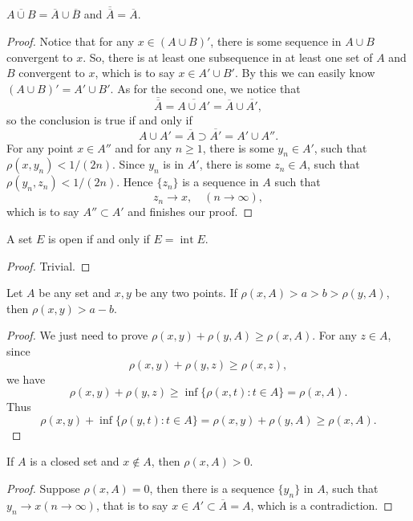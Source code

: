 \begin{pro}%
	$\overline{A\cup B}=\overline{A}\cup\overline{B}$ and $\overline{\overline{A}}=\overline{A}$.
\end{pro}
\begin{proof}
	Notice that for any $x\in(A\cup B)'$, there is some sequence in $A\cup B$ convergent to $x$. So, there is at least one subsequence in at least one set of $A$ and $B$ convergent to $x$, which is to say $x\in A'\cup B'$. By this we can easily know $(A\cup B)'=A'\cup B'$. As for the second one, we notice that
	\[\overline{\overline{A}}=\overline{A\cup A'}=\overline{A}\cup \overline{A'},\]
	so the conclusion is true if and only if 
	\[A\cup A'=\overline{A}\supset \overline{A'}=A'\cup A''.\]
	For any point $x\in A''$ and for any $n\geq 1$, there is some $y_n\in A'$, such that $\rho(x,y_n)<1/(2n)$. Since $y_n$ is in $A'$, there is some $z_n\in A$, such that $\rho(y_n,z_n)<1/(2n)$. Hence $\{z_n\}$ is a sequence in $A$ such that
	\[z_n\to x,\quad (n\to\infty),\]
	which is to say $A''\subset A'$ and finishes our proof.
\end{proof}

\begin{pro}%
	A set $E$ is open if and only if $E=\mathop{int} E$.
\end{pro}
\begin{proof}
	Trivial.
\end{proof}

\begin{pro}%
	Let $A$ be any set and $x,y$ be any two points. If $\rho(x,A)>a>b>\rho(y,A)$, then $\rho(x,y)>a-b$.
\end{pro}
\begin{proof}
	We just need to prove $\rho(x,y)+\rho(y,A)\geq \rho(x,A)$. For any $z\in A$, since
	\[\rho(x,y)+\rho(y,z)\geq \rho(x,z),\]
	we have
	\[\rho(x,y)+\rho(y,z)\geq \inf\{\rho(x,t)\colon t\in A\}=\rho(x,A).\]
	Thus
	\[\rho(x,y)+\inf\{\rho(y,t)\colon t\in A\}=\rho(x,y)+\rho(y,A)\geq \rho(x,A).\]
\end{proof}

\begin{pro}%
	If $A$ is a closed set and $x\not\in A$, then $\rho(x,A)>0$.
\end{pro}
\begin{proof}
	Suppose $\rho(x,A)=0$, then there is a sequence $\{y_n\}$ in $A$, such that $y_n\to x(n\to\infty)$, that is to say  $x\in A'\subset\overline{A}=A$, which is a contradiction.
\end{proof}

